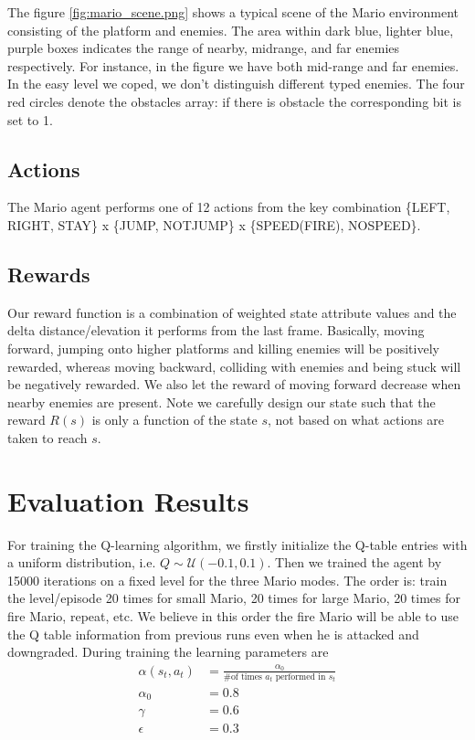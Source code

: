 The figure \ref{fig:mario_scene.png} shows a typical scene of the Mario environment consisting of the platform and enemies. The area within dark blue, lighter blue, purple boxes indicates the range of nearby, midrange, and far enemies respectively. For instance, in the figure we have both mid-range and far enemies. In the easy level we coped, we don't distinguish different typed enemies. The four red circles denote the obstacles array: if there is obstacle the corresponding bit is set to 1. 

\subsection{Actions}
The Mario agent performs one of 12 actions from the key combination \{LEFT, RIGHT, STAY\} x \{JUMP, NOTJUMP\} x \{SPEED(FIRE), NOSPEED\}.

\subsection{Rewards}
Our reward function is a combination of weighted state attribute values and the delta distance/elevation it performs from the last frame. Basically, moving forward, jumping onto higher platforms and killing enemies will be positively rewarded, whereas moving backward, colliding with enemies and being stuck will be negatively rewarded. We also let the reward of moving forward decrease when nearby enemies are present. 
Note we carefully design our state such that the reward $R(s)$ is only a function of the state $s$, not based on what actions are taken to reach $s$.

\section{Evaluation Results}
For training the Q-learning algorithm, we firstly initialize the Q-table entries with a uniform distribution, i.e. $Q \sim \mathcal{U}\left(-0.1,0.1\right)$. Then we trained the agent by 15000 iterations on a fixed level for the three Mario modes. The order is: train the level/episode 20 times for small Mario, 20 times for large Mario, 20 times for fire Mario, repeat, etc. We believe in this order the fire Mario will be able to use the Q table information from previous runs even when he is attacked and downgraded. During training the learning parameters are
\begin{align*}
\alpha(s_t, a_t) &= \frac{\alpha_0}{\text{\# of times $a_t$ performed in $s_t$}} \\
\alpha_0 &= 0.8\\
\gamma &= 0.6\\
\epsilon &= 0.3
\end{align*}

